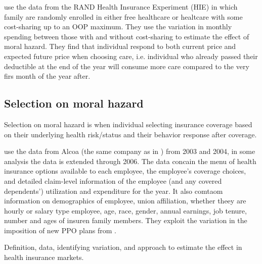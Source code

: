 \documentclass{article}
\newcommand{\bib}{references.bib}
\begin{document}
\cite{brot2017does} use the data from the RAND Health Insurance Experiment (HIE) in which family are randomly enrolled in either free healthcare or healtcare with some cost-sharing up to an OOP maximum. They use the variation in monthly spending between those with and without cost-sharing to estimate the effect of moral hazard. They find that individual respond to both current price and expected future price when choosing care, i.e. individual who already passed their deductible at the end of the year will consume more care compared to the very firs month of the year after.

\subsection*{Selection on moral hazard}
Selection on moral hazard is when individual selecting insurance coverage based on their underlying health risk/status and their behavior response after coverage.

\cite{einav2013selection} use the data from Alcoa (the same company as in \cite{einav2010estimating}) from 2003 and 2004, in some analysis the data is extended through 2006. The data concain the menu of health insurance options available to each employee, the employee's coverage choices, and detailed claim-level information of the employee (and any covered dependents') utilization and expenditure for the year. It also comtaom information on demographics of employee, union affiliation, whether theey are hourly or salary type employee, age, race, gender, annual earnings, job tenure, number and ages of insuren family members. They exploit the variation in the imposition of new PPO plans from .

Definition, data, identifying variation, and approach to estimate the effect in health insurance markets.


\end{document}
